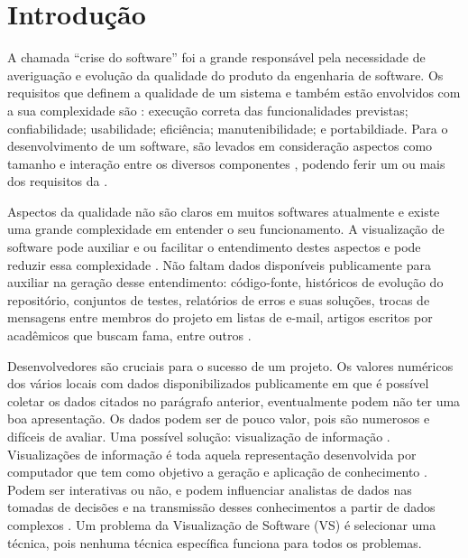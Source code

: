 \chapter{Introdução}


A chamada ``crise do software'' \cite{arthur1985measuring} foi a grande
responsável pela necessidade de averiguação e evolução da qualidade do produto
da engenharia de software. Os requisitos que definem a qualidade de um sistema
e também estão envolvidos com a sua complexidade são
\cite{behkamal2009customizing}: execução correta das funcionalidades previstas;
confiabilidade; usabilidade; eficiência; manutenibilidade; e portabildiade. Para
o desenvolvimento de um software, são levados em consideração aspectos como
tamanho e interação entre os diversos componentes \cite{koscianski2007qualidade},
podendo ferir um ou mais dos requisitos da .

Aspectos da qualidade não são claros em muitos softwares atualmente e existe
uma grande complexidade em entender o seu funcionamento. A visualização de
software pode auxiliar e ou facilitar o entendimento destes aspectos e pode
reduzir essa complexidade \cite{messias2012} \cite{benkler2006wealth}. Não
faltam dados disponíveis publicamente para auxiliar na geração desse
entendimento: código-fonte, históricos de evolução do repositório, conjuntos de
testes, relatórios de erros e suas soluções, trocas de mensagens entre membros
do projeto em listas de e-mail, artigos escritos por acadêmicos que buscam fama,
entre outros \cite{messias2012} \cite{benkler2006wealth}.

Desenvolvedores são cruciais para o sucesso de um projeto. Os valores
numéricos dos vários locais com dados disponibilizados publicamente em que é
possível coletar os dados citados no parágrafo anterior, eventualmente podem não
ter uma boa apresentação. Os dados podem ser de pouco valor, pois são numerosos
e difíceis de avaliar. Uma possível solução: visualização de informação
\cite{messias2012}. Visualizações de informação é toda aquela representação
desenvolvida por computador que tem como objetivo a geração e aplicação de
conhecimento \cite{card1999readings}. Podem ser interativas ou não, e podem
influenciar analistas de dados nas tomadas de decisões e na transmissão desses
conhecimentos a partir de dados complexos \cite{card1999readings}. Um problema
da Visualização de Software (VS) é selecionar uma técnica, pois nenhuma técnica
específica funciona para todos os problemas.

